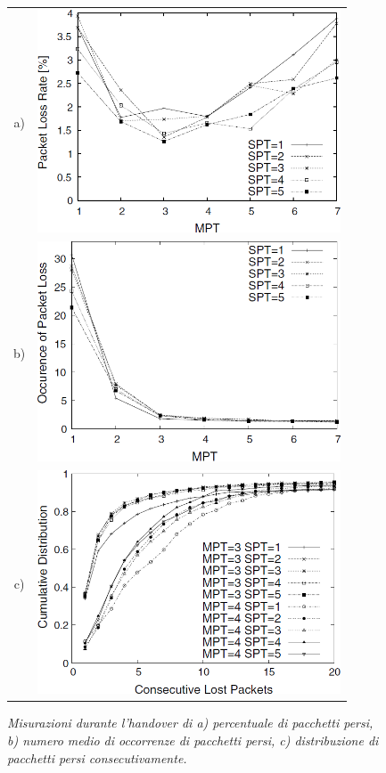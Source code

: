 \documentclass[12pt,a4paper,openright,twoside]{book}
\begin{document}
\begin{figure}
  \centering
  \begin{tabular}{cc}
    a) & \includegraphics[width=9cm]{img/mona-sim-packet-loss-rate}  \\
    b) & \includegraphics[width=9cm]{img/mona-sim-packet-loss-occur} \\
    c) & \includegraphics[width=9cm]{img/mona-sim-packet-loss-distrib}  \\
  \end{tabular}
  \caption{\em Misurazioni durante l'handover di a) percentuale di
    pacchetti persi, b) numero medio di occorrenze di pacchetti persi,
    c) distribuzione di pacchetti persi consecutivamente.}
  \label{fig:mona:qos-sim-packet-loss}
\end{figure}
\end{document}
